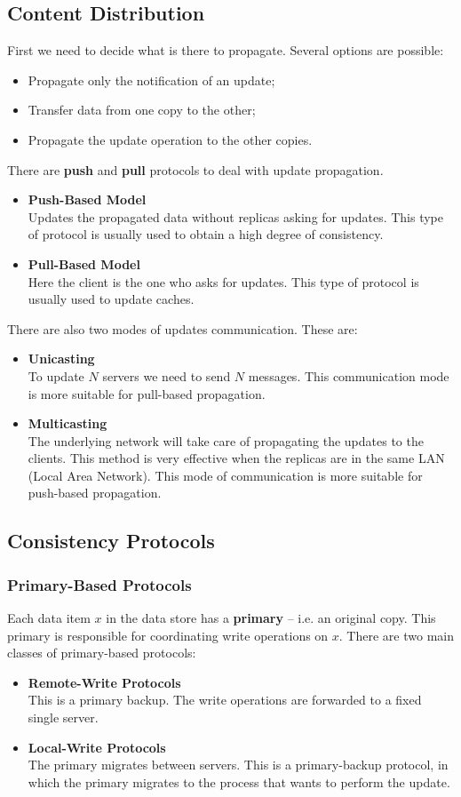 \documentclass{article}
\begin{document}
\subsection{Content Distribution}
First we need to decide what is there to propagate. Several options are possible:
\begin{itemize}
	\item Propagate only the notification of an update;
	\item Transfer data from one copy to the other;
	\item Propagate the update operation to the other copies.
\end{itemize}
There are \textbf{push} and \textbf{pull} protocols to deal with update propagation.
\begin{itemize}
	\item \textbf{Push-Based Model} \\
	Updates the propagated data without replicas asking for updates. This type of protocol is usually used to obtain a high degree of consistency.
	\item \textbf{Pull-Based Model} \\
	Here the client is the one who asks for updates. This type of protocol is usually used to update caches.
\end{itemize}
There are also two modes of updates communication. These are:
\begin{itemize}
	\item \textbf{Unicasting} \\
	To update $N$ servers we need to send $N$ messages. This communication mode is more suitable for pull-based propagation.
	\item \textbf{Multicasting} \\
	The underlying network will take care of propagating the updates to the clients. This method is very effective when the replicas are in the same LAN (Local Area Network). This mode of communication is more suitable for push-based propagation.
\end{itemize}

\subsection{Consistency Protocols}
\subsubsection{Primary-Based Protocols}
Each data item $x$ in the data store has a \textbf{primary} -- i.e. an original copy. This primary is responsible for coordinating write operations on $x$. There are two main classes of primary-based protocols:
\begin{itemize}
	\item \textbf{Remote-Write Protocols} \\
	This is a primary backup. The write operations are forwarded to a fixed single server.
	\item \textbf{Local-Write Protocols} \\
	The primary migrates between servers. This is a primary-backup protocol, in which the primary migrates to the process that wants to perform the update.
\end{itemize}
\end{document}
